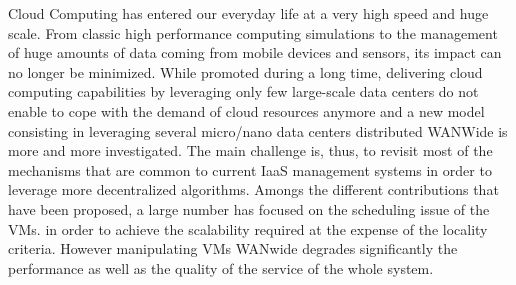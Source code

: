 
Cloud Computing has entered our everyday life at a very high speed and huge
scale. From classic high performance computing simulations to the management of
huge amounts of data coming from mobile devices and sensors, its impact can no
longer be minimized.
While promoted during a long time, delivering cloud computing capabilities by
leveraging only few large-scale data centers do not enable to cope with the
demand of cloud resources anymore and a new model consisting in leveraging
several micro/nano data centers distributed WANWide is more and more
investigated.
The main challenge is, thus, to revisit most of the mechanisms that are common
to current IaaS management systems in order to leverage more decentralized
algorithms. Amongs the different contributions that have been proposed, a large number has focused on the scheduling issue of the VMs. 
in order to achieve the scalability required at the expense of the locality criteria. 
However manipulating VMs WANwide degrades significantly the performance as well as the quality of the service of the whole system. 

% 

